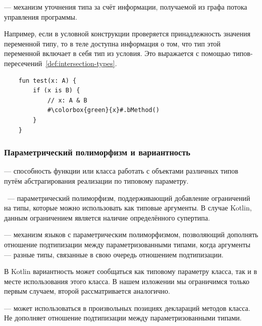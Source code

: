 \begin{definition}
     --- механизм уточнения типа за счёт информации, получаемой из графа потока управления программы.
\end{definition}

Например, если в условной конструкции проверяется принадлежность значения переменной типу, то в теле доступна информация о том, что тип этой переменной включает в себя тип из условия.
Это выражается с помощью типов-пересечений~\ref{def:intersection-types}.

\begin{verbatim}
    fun test(x: A) {
        if (x is B) {
            // x: A & B
            #\colorbox{green}{x}#.bMethod()
        }
    }
\end{verbatim}

\subsubsection{Параметрический полиморфизм и вариантность}\label{subsubsec:variance}

\begin{definition}
    \label{def:param-poly}
     --- способность функции или класса работать с объектами различных типов путём абстрагирования реализации по типовому параметру.
\end{definition}

\begin{definition}
    ~--- параметрический полиморфизм, поддерживающий добавление ограничений на типы, которые можно использовать как типовые аргументы.
    В случае Kotlin, данным ограничением является наличие определённого супертипа.
\end{definition}

\begin{definition}
     --- механизм языков с параметрическим полиморфизмом, позволяющий дополнять отношение подтипизации между параметризованными типами, когда аргументы --- разные типы, связанные в свою очередь отношением подтипизации.
\end{definition}

В Kotlin вариантность может сообщаться как типовому параметру класса, так и в месте использования этого класса.
В нашем изложении мы ограничимся только первым случаем, второй рассматривается аналогично.

\begin{definition}\label{def:invariant}
     --- может использоваться в произвольных позициях деклараций методов класса.
    Не дополняет отношение подтипизации между параметризованными типами.
\end{definition}

